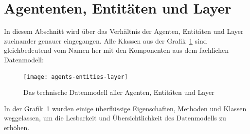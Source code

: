 %


\section{Agententen, Entitäten und Layer}\label{sec:agents-entities-layers}

In diesem Abschnitt wird über das Verhältnis der Agenten, Entitäten und Layer zueinander genauer eingegangen.
Alle Klassen aus der Grafik~\ref{fig:agents-entities-layer} sind gleichbedeutend vom Namen her mit den Komponenten aus dem fachlichen Datenmodell:

\begin{figure}[h]
    \centering
    \texttt{[image: agents-entities-layer]}~\caption{Das technische Datenmodell aller Agenten, Entitäten und Layer}
    \label{fig:agents-entities-layer}
\end{figure}

In der Grafik~\ref{fig:agents-entities-layer} wurden einige überflüssige Eigenschaften, Methoden und Klassen weggelassen, um die Lesbarkeit und Übersichtlichkeit des Datenmodells zu erhöhen.

